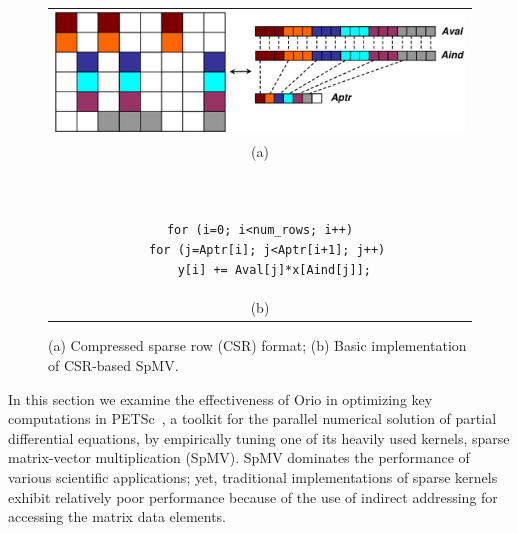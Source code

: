 \begin{figure}%
\begin{tabular}{c}
\begin{minipage}[b]{.47\textwidth}
\centering
\includegraphics[width=1.0\textwidth]{figures/spmv.eps}  
\end{minipage}
\\
{\footnotesize (a)}
\\
\begin{minipage}[b]{.3\textwidth}
\scriptsize
\begin{verbatim}


for (i=0; i<num_rows; i++)
  for (j=Aptr[i]; j<Aptr[i+1]; j++)
    y[i] += Aval[j]*x[Aind[j]];

\end{verbatim}
\end{minipage}
\\
{\footnotesize (b)}
\\
\end{tabular}

\caption{(a) Compressed sparse row (CSR) format; (b) Basic implementation of CSR-based SpMV.}
\label{fig:spmv}
\end{figure}

In this section we examine the effectiveness of Orio in optimizing key
computations in PETSc~\cite{petsc-user-ref}, a toolkit for the parallel
numerical solution of partial differential equations, by empirically tuning
one of its heavily used kernels, sparse matrix-vector multiplication
(SpMV). SpMV dominates the performance of various scientific applications;
yet, traditional implementations of sparse kernels exhibit relatively poor
performance because of the use of indirect addressing for accessing the
matrix data elements.

